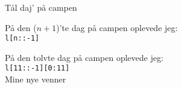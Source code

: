 \begin{song}{Tål daj' på campen}
  \renewcommand{\theSBVerseCnt}{$n<11$}

  \begin{SBVerse}
    På den ($n+1$)'te dag på campen oplevede jeg:\\
    \texttt{l[n::-1]}
  \end{SBVerse}

  \renewcommand{\theSBVerseCnt}{$11$}

  \begin{SBVerse}
    På den tolvte dag på campen oplevede jeg:\\
    \texttt{l[11::-1][0:11]}\\
    Mine nye venner
  \end{SBVerse}

\end{song}